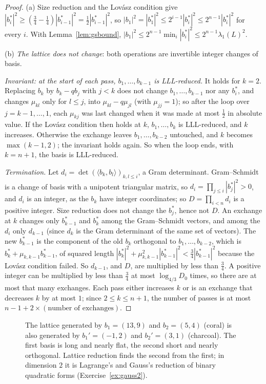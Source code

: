 \begin{proof}
(a) Size reduction and the Lov\'asz condition give $|b_i^*|^2\ge(\frac34-\frac14)|b_{i-1}^*|^2=\frac12|b_{i-1}^*|^2$, so $|b_1|^2=|b_1^*|^2\le2^{i-1}|b_i^*|^2\le2^{n-1}|b_i^*|^2$ for every $i$. With
Lemma~\ref{lem:gsbound}, $|b_1|^2\le2^{n-1}\min_i|b_i^*|^2\le2^{n-1}\lambda_1(L)^2$.

(b) \emph{The lattice does not change}: both operations are invertible integer changes of basis.

\emph{Invariant: at the start of each pass, $b_1,\dots,b_{k-1}$ is LLL-reduced.} It holds for $k=2$. Replacing $b_k$ by $b_k-qb_j$ with $j<k$ does not change $b_1,\dots,b_{k-1}$ nor any $b_i^*$, and changes
$\mu_{kl}$ only for $l\le j$, into $\mu_{kl}-q\mu_{jl}$ (with $\mu_{jj}=1$); so after the loop over $j=k-1,\dots,1$, each $\mu_{kj}$ was last changed when it was made at most $\frac12$ in absolute value. If the Lov\'asz
condition then holds at $k$, $b_1,\dots,b_k$ is LLL-reduced, and $k$ increases. Otherwise the exchange leaves $b_1,\dots,b_{k-2}$ untouched, and $k$ becomes $\max(k-1,2)$; the invariant holds again. So when the
loop ends, with $k=n+1$, the basis is LLL-reduced.

\emph{Termination.} Let $d_i=\det(\langle b_k,b_l\rangle)_{k,l\le i}$, a Gram determinant. Gram--Schmidt is a change of basis with a unipotent triangular matrix, so $d_i=\prod_{j\le i}|b_j^*|^2>0$, and $d_i$
is an integer, as the $b_k$ have integer coordinates; so $D=\prod_{i<n}d_i$ is a positive integer. Size reduction does not change the $b_j^*$, hence not $D$. An exchange at $k$ changes only
$b_{k-1}^*$ and $b_k^*$ among the Gram--Schmidt vectors, and among the $d_i$ only $d_{k-1}$ (since $d_k$ is the Gram determinant of the same set of vectors). The new $b_{k-1}^*$ is the component of the old $b_k$
orthogonal to $b_1,\dots,b_{k-2}$, which is $b_k^*+\mu_{k,k-1}b_{k-1}^*$, of squared length $|b_k^*|^2+\mu_{k,k-1}^2|b_{k-1}^*|^2<\frac34|b_{k-1}^*|^2$ because the Lov\'asz condition failed. So $d_{k-1}$, and $D$, are multiplied
by less than $\frac34$. A positive integer can be multiplied by less than $\frac34$ at most $\log_{4/3}D_0$ times, so there are at most that many exchanges. Each pass either increases $k$ or
is an exchange that decreases $k$ by at most $1$; since $2\le k\le n+1$, the number of passes is at most $n-1+2\times(\text{number of exchanges})$.
\end{proof}

\begin{figure}[ht]
\centering
{}
\caption{The lattice generated by $b_1=(13,9)$ and $b_2=(5,4)$ (coral) is also generated by $b_1'=(-1,2)$ and $b_2'=(3,1)$ (charcoal). The first basis is long and nearly flat, the second
short and nearly orthogonal. Lattice reduction finds the second from the first; in dimension $2$ it is Lagrange's and Gauss's reduction of binary quadratic forms (Exercise~\ref{ex:gauss2}).}
\label{fig:lattice}
\end{figure}

